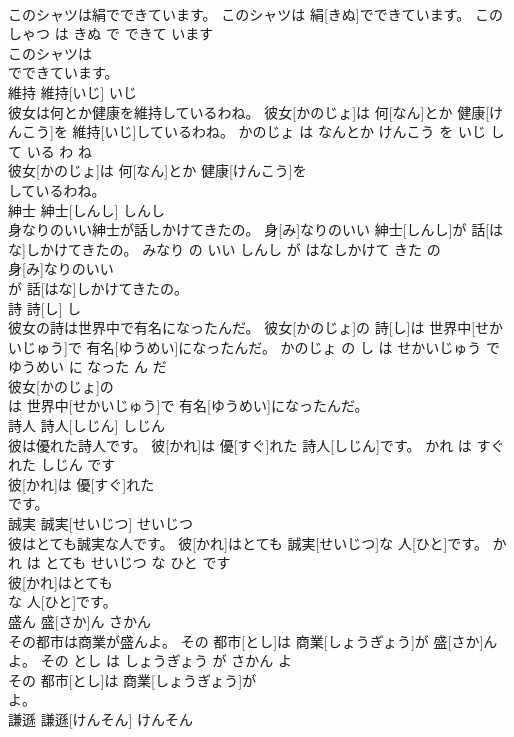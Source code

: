 \documentclass[8pt]{extreport}
\begin{document}
\begin{CJK}{UTF8}{min}
\\	このシャツは絹でできています。	このシャツは 絹[きぬ]でできています。	この しゃつ は きぬ で できて います	
\\	このシャツは
\\	でできています。			
\\	維持	維持[いじ]	いじ	
\\	彼女は何とか健康を維持しているわね。	彼女[かのじょ]は 何[なん]とか 健康[けんこう]を 維持[いじ]しているわね。	かのじょ は なんとか けんこう を いじ して いる わ ね	
\\	彼女[かのじょ]は 何[なん]とか 健康[けんこう]を
\\	しているわね。			
\\	紳士	紳士[しんし]	しんし	
\\	身なりのいい紳士が話しかけてきたの。	身[み]なりのいい 紳士[しんし]が 話[はな]しかけてきたの。	みなり の いい しんし が はなしかけて きた の	
\\	身[み]なりのいい
\\	が 話[はな]しかけてきたの。			
\\	詩	詩[し]	し	
\\	彼女の詩は世界中で有名になったんだ。	彼女[かのじょ]の 詩[し]は 世界中[せかいじゅう]で 有名[ゆうめい]になったんだ。	かのじょ の し は せかいじゅう で ゆうめい に なった ん だ	
\\	彼女[かのじょ]の
\\	は 世界中[せかいじゅう]で 有名[ゆうめい]になったんだ。			
\\	詩人	詩人[しじん]	しじん	
\\	彼は優れた詩人です。	彼[かれ]は 優[すぐ]れた 詩人[しじん]です。	かれ は すぐれた しじん です	
\\	彼[かれ]は 優[すぐ]れた
\\	です。			
\\	誠実	誠実[せいじつ]	せいじつ	
\\	彼はとても誠実な人です。	彼[かれ]はとても 誠実[せいじつ]な 人[ひと]です。	かれ は とても せいじつ な ひと です	
\\	彼[かれ]はとても
\\	な 人[ひと]です。			
\\	盛ん	盛[さか]ん	さかん	
\\	その都市は商業が盛んよ。	その 都市[とし]は 商業[しょうぎょう]が 盛[さか]んよ。	その とし は しょうぎょう が さかん よ	
\\	その 都市[とし]は 商業[しょうぎょう]が
\\	よ。			
\\	謙遜	謙遜[けんそん]	けんそん	

\end{CJK}
\end{document}
